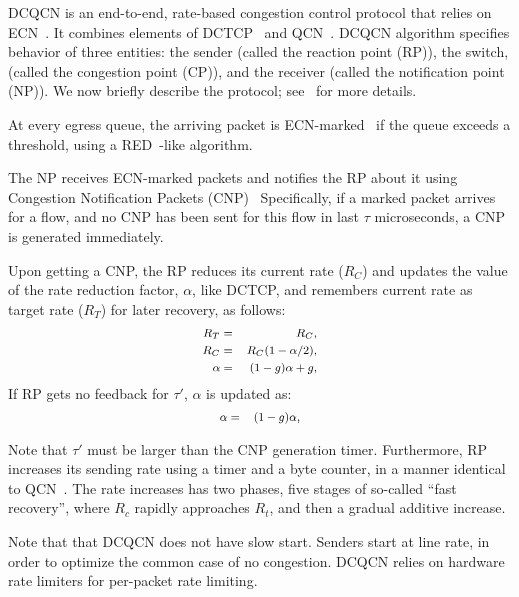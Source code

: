 DCQCN is an end-to-end, rate-based congestion control protocol that relies on
ECN~\cite{ecn}. It combines elements of DCTCP~\cite{dctcp} and QCN~\cite{qcn}.
DCQCN algorithm specifies behavior of three entities: the sender (called the
reaction point (RP)), the switch, (called the congestion point (CP)), and the
receiver (called the notification point (NP)). We now briefly describe the
protocol; see~\cite{dcqcn} for more details.

 At every egress queue, the arriving packet is
ECN-marked~\cite{ecn} if the queue exceeds a threshold, using a
RED~\cite{red}-like algorithm.

 The NP receives ECN-marked packets and notifies the RP about
it using Congestion Notification Packets (CNP)~\cite{rocev2} Specifically, if a
marked packet arrives for a flow, and no CNP has been sent for this flow in last
$\tau$ microseconds, a CNP is generated immediately.

 Upon getting a CNP, the RP reduces its current rate ($R_C$)
and updates the value of the rate reduction factor, $\alpha$, like DCTCP, and
remembers current rate as target rate ($R_T$) for later recovery, as follows:
\begin{equation} 
\small 
\begin{aligned} 
R_T &=& R_C,	\\ 
R_C &=& R_C (1 -\alpha/2),  \\ 
\alpha &=& (1-g)\alpha + g, 
\end{aligned} 
\label{eq:rp_dec}
\end{equation} 
If RP gets no feedback for $\tau'$, $\alpha$ is updated as:
\begin{equation} 
\small 
\begin{aligned} 
\alpha &=& (1-g)\alpha, 
\end{aligned}
\label{eq:rp_alpha_recover} 
\end{equation}

Note that $\tau'$ must be larger than the CNP generation timer. Furthermore, RP
increases its sending rate using a timer and a byte counter, in a manner
identical to QCN~\cite{qcn}. The rate increases has two phases, five stages of
so-called ``fast recovery'', where $R_c$ rapidly approaches $R_t$, and then a
gradual additive increase.

Note that that DCQCN does not have slow start. Senders start at line rate, in
order to optimize the common case of no congestion. DCQCN relies on hardware
rate limiters for per-packet rate limiting. 
